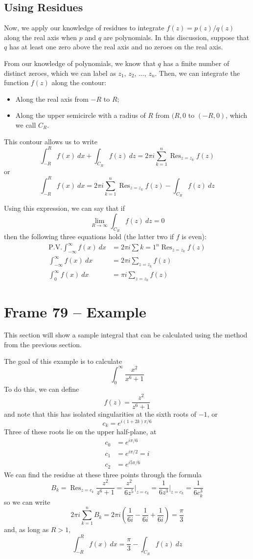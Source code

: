 \documentclass{article}
\DeclareMathOperator{\Res}{Res}
\begin{document}
\subsection{Using Residues}
Now, we apply our knowledge of residues to integrate $f(z) = p(z)/q(z)$ along the real axis when $p$ and $q$ are polynomials. In this discussion, suppose that $q$ has at least one zero above the real axis and no zeroes on the real axis.

From our knowledge of polynomials, we know that $q$ has a finite number of distinct zeroes, which we can label as $z_1$, $z_2$, $\dots$, $z_n$. Then, we can integrate the function $f(z)$ along the contour:
\begin{itemize}
	\item Along the real axis from $-R$ to $R$;
	\item Along the upper semicircle with a radius of $R$ from $(R, 0$ to $(-R, 0)$, which we call $C_R$.
\end{itemize}
This contour allows us to write
\[
	\int_{-R}^R f(x)~dx + \int_{C_R} f(z)~dz 
	= 2\pi i \sum_{k=1}^n \Res_{z = z_k} f(z)
\]
or
\[
	\int_{-R}^R f(x)~dx  
	= 2\pi i \sum_{k=1}^n \Res_{z = z_k} f(z)
	- \int_{C_R} f(z)~dz
\]

Using this expression, we can say that if
\[
	\lim_{R \to \infty} \int_{C_R} f(z)~dz = 0
\]
then the following three equations hold (the latter two if $f$ is even):
\begin{align*}
	\text{P.V.}\int_{-\infty}^\infty f(x)~dx &= 2\pi i\sum{k=1}^n \Res_{z=z_k} f(z) \\
	\int_{-\infty}^\infty f(x)~dx &= 2\pi i \sum_{z=z_k} f(z) \\
	\int_{0}^\infty       f(x)~dx &=  \pi i \sum_{z=z_k} f(z)
\end{align*}


\clearpage
\section{Frame 79 -- Example}
This section will show a sample integral that can be calculated using the method from the previous section.

The goal of this example is to calculate
\[
	\int_{0}^\infty \frac{x^2}{x^6 + 1}
\]
To do this, we can define 
\[
	f(z) = \frac{z^2}{z^6 + 1}
\]
and note that this has isolated singularities at the sixth roots of $-1$, or
\[
	c_k = e^{i (1 + 2k) \pi/6}
\]
Three of these roots lie on the upper half-plane, at
\begin{align*}
	c_0 &= e^{i\pi/6} \\
	c_1 &= e^{i\pi/2} = i \\
	c_2 &= e^{i5\pi/6}
\end{align*}
We can find the residue at these three points through the formula
\[
	B_k 
	= \Res_{z=c_k} \frac{z^2}{z^6 + 1}
	= \frac{z^2}{6z^5} \Big|_{z=c_k}
	= \frac{1}{6z^3} \Big|_{z=c_k}
	= \frac{1}{6c_k^3}
\]
so we can write
\[
	2\pi i \sum_{k=1}^n B_k
	= 2\pi i \left( \frac{1}{6i} - \frac{1}{6i} + \frac{1}{6i} \right)
	= \frac{\pi}{3}
\]
and, as long as $R > 1$,
\[
	\int_{-R}^R f(x)~dx = \frac{\pi}{3} - \int_{C_R} f(z)~dz
\]
\end{document}
